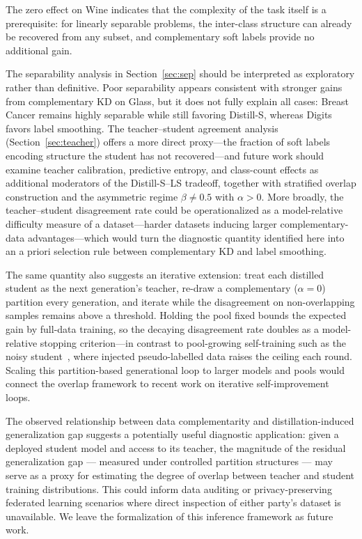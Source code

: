 \documentclass[a4paper,fleqn]{cas-dc}
\begin{document}
The zero effect on Wine indicates that the complexity of the task itself is a prerequisite: for linearly separable problems, the inter-class structure can already be recovered from any subset, and complementary soft labels provide no additional gain.

The separability analysis in Section~\ref{sec:sep} should be interpreted as
exploratory rather than definitive. Poor separability appears consistent
with stronger gains from complementary KD on Glass, but it does not fully
explain all cases: Breast Cancer remains highly separable while still
favoring Distill-S, whereas Digits favors label smoothing. The
teacher--student agreement analysis (Section~\ref{sec:teacher}) offers a
more direct proxy---the fraction of soft labels encoding structure the
student has not recovered---and future work should examine teacher
calibration, predictive entropy, and class-count effects as additional
moderators of the Distill-S--LS tradeoff, together with stratified
overlap construction and the asymmetric regime $\beta \neq 0.5$ with
$\alpha > 0$. More broadly, the teacher--student disagreement rate
could be operationalized as a model-relative difficulty measure of a
dataset---harder datasets inducing larger complementary-data
advantages---which would turn the diagnostic quantity identified here
into an a priori selection rule between complementary KD and label
smoothing.

The same quantity also suggests an iterative extension: treat each distilled student as the next generation's teacher, re-draw a complementary ($\alpha{=}0$) partition every generation, and iterate while the disagreement on non-overlapping samples remains above a threshold. Holding the pool fixed bounds the expected gain by full-data training, so the decaying disagreement rate doubles as a model-relative stopping criterion---in contrast to pool-growing self-training such as the noisy student~\citep{xie2020noisy}, where injected pseudo-labelled data raises the ceiling each round. Scaling this partition-based generational loop to larger models and pools would connect the overlap framework to recent work on iterative self-improvement loops.

The observed relationship between data complementarity and distillation-induced generalization gap suggests a potentially useful diagnostic application: given a deployed student model and access to its teacher, the magnitude of the residual generalization gap --- measured under controlled partition structures --- may serve as a proxy for estimating the degree of overlap between teacher and student training distributions. This could inform data auditing or privacy-preserving federated learning scenarios where direct inspection of either party's dataset is unavailable. We leave the formalization of this inference framework as future work.
\end{document}
